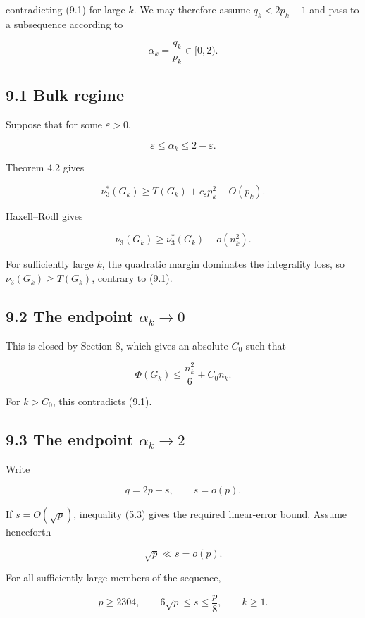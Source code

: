 \documentclass[english,11pt,a4paper]{article}
\begin{document}
contradicting (9.1) for large \(k\). We may therefore assume
\(q_k<2p_k-1\) and pass to a subsequence according to

\[
\alpha_k=\frac{q_k}{p_k}\in[0,2).
\]

\subsection{9.1 Bulk regime}\label{bulk-regime}

Suppose that for some \(\varepsilon>0\),

\[
\varepsilon\le\alpha_k\le2-\varepsilon.
\]

Theorem 4.2 gives

\[
\nu_3^*(G_k)
\ge
T(G_k)+c_\varepsilon p_k^2-O(p_k).
\]

Haxell--Rödl gives

\[
\nu_3(G_k)
\ge
\nu_3^*(G_k)-o(n_k^2).
\]

For sufficiently large \(k\), the quadratic margin dominates the
integrality loss, so \(\nu_3(G_k)\ge T(G_k)\), contrary to (9.1).

\subsection{\texorpdfstring{9.2 The endpoint
\(\alpha_k\to0\)}{9.2 The endpoint \textbackslash alpha\_k\textbackslash to0}}\label{the-endpoint-alpha_kto0}

This is closed by Section 8, which gives an absolute \(C_0\) such that

\[
\Phi(G_k)
\le
\frac{n_k^2}{6}+C_0n_k.
\]

For \(k>C_0\), this contradicts (9.1).

\subsection{\texorpdfstring{9.3 The endpoint
\(\alpha_k\to2\)}{9.3 The endpoint \textbackslash alpha\_k\textbackslash to2}}\label{the-endpoint-alpha_kto2}

Write

\[
q=2p-s,
\qquad
s=o(p).
\]

If \(s=O(\sqrt p)\), inequality (5.3) gives the required linear-error
bound. Assume henceforth

\[
\sqrt p\ll s=o(p).
\tag{9.3}
\]

For all sufficiently large members of the sequence,

\[
p\ge2304,
\qquad
6\sqrt p\le s\le\frac p8,
\qquad
k\ge1.
\tag{9.4}
\]
\end{document}
